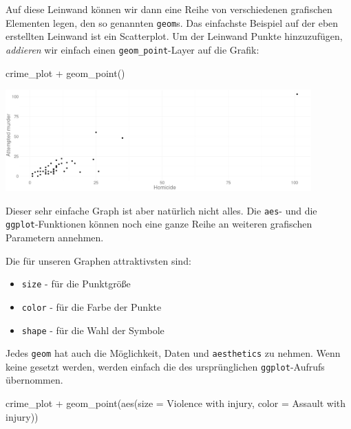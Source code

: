 \documentclass[
]{book}
\newenvironment{Shaded}{\begin{snugshade}}{\end{snugshade}}
\newcommand{\AttributeTok}[1]{\textcolor[rgb]{0.77,0.63,0.00}{#1}}
\newcommand{\FunctionTok}[1]{\textcolor[rgb]{0.00,0.00,0.00}{#1}}
\newcommand{\NormalTok}[1]{#1}
\newcommand{\SpecialCharTok}[1]{\textcolor[rgb]{0.00,0.00,0.00}{#1}}
\newcommand{\StringTok}[1]{\textcolor[rgb]{0.31,0.60,0.02}{#1}}
\providecommand{\tightlist}{%
  \setlength{\itemsep}{0pt}\setlength{\parskip}{0pt}}
\begin{document}
Auf diese Leinwand können wir dann eine Reihe von verschiedenen grafischen Elementen legen, den so genannten \texttt{geom}s. Das einfachste Beispiel auf der eben erstellten Leinwand ist ein Scatterplot.
Um der Leinwand Punkte hinzuzufügen, \emph{addieren} wir einfach einen \texttt{geom\_point}-Layer auf die Grafik:

\begin{Shaded}
\begin{Highlighting}[]
\NormalTok{crime\_plot }\SpecialCharTok{+} \FunctionTok{geom\_point}\NormalTok{()}
\end{Highlighting}
\end{Shaded}

\begin{center}\includegraphics[width=333.333333333333pt]{imgs/pts} \end{center}

Dieser sehr einfache Graph ist aber natürlich nicht alles. Die \texttt{aes}- und die \texttt{ggplot}-Funktionen können noch eine ganze Reihe an weiteren grafischen Parametern annehmen.

Die für unseren Graphen attraktivsten sind:

\begin{itemize}
\tightlist
\item
  \texttt{size} - für die Punktgröße
\item
  \texttt{color} - für die Farbe der Punkte
\item
  \texttt{shape} - für die Wahl der Symbole
\end{itemize}

Jedes \texttt{geom} hat auch die Möglichkeit, Daten und \texttt{aesthetics} zu nehmen. Wenn keine gesetzt werden, werden einfach die des ursprünglichen \texttt{ggplot}-Aufrufs übernommen.

\begin{Shaded}
\begin{Highlighting}[]
\NormalTok{crime\_plot }\SpecialCharTok{+} \FunctionTok{geom\_point}\NormalTok{(}\FunctionTok{aes}\NormalTok{(}\AttributeTok{size =} \StringTok{\textasciigrave{}}\AttributeTok{Violence with injury}\StringTok{\textasciigrave{}}\NormalTok{, }
                            \AttributeTok{color =} \StringTok{\textasciigrave{}}\AttributeTok{Assault with injury}\StringTok{\textasciigrave{}}\NormalTok{))}
\end{Highlighting}
\end{Shaded}
\end{document}
